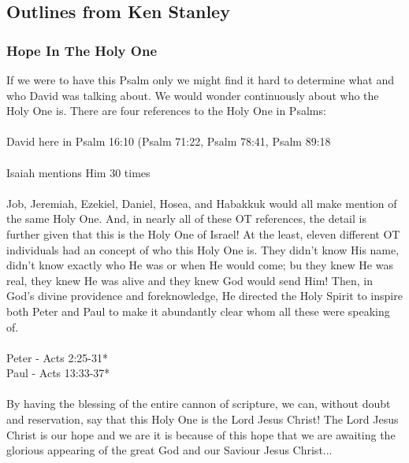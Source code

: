 \subsection{Outlines from Ken Stanley}


\subsubsection{Hope In The Holy One}



If we were to have this Psalm only we might find it hard to determine what and who David was talking about. We would wonder continuously about who the Holy One is. There are four references to the Holy One in Psalms:\\
\\
David here in Psalm 16:10 (Psalm 71:22, Psalm 78:41, Psalm 89:18\\
\\
Isaiah mentions Him 30 times\\
\\
Job, Jeremiah, Ezekiel, Daniel, Hosea, and Habakkuk would all make mention of the same Holy One. And, in nearly all of these OT references, the detail is further given that this is the Holy One of Israel! 
At the least, eleven different OT individuals had an concept of who this Holy One is. They didn’t know His name, didn’t know exactly who He was or when He would come; bu they knew He was real, they knew He was alive and they knew God would send Him! Then, in God’s divine providence and foreknowledge, He directed the Holy Spirit to inspire both Peter and Paul to make it abundantly clear whom all these were speaking of.\\
\\
Peter - Acts 2:25-31*\\
Paul - Acts 13:33-37*\\
\\
By having the blessing of the entire cannon of scripture, we can, without doubt and reservation, say that this Holy One is the Lord Jesus Christ!  The Lord Jesus Christ is our hope and we are it is because of this hope that we are awaiting the glorious appearing of the great God and our Saviour Jesus Christ...\\
